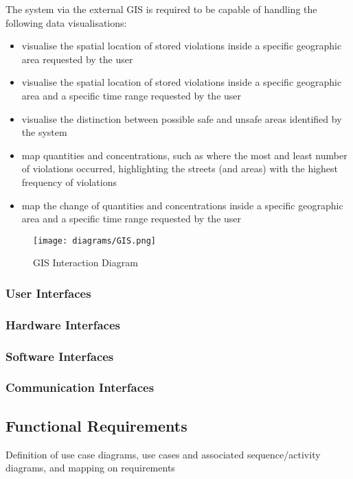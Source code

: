 	The system via the external GIS is required to be capable of handling the following data visualisations:
	
	\begin{itemize}
		\item visualise the spatial location of stored violations inside a specific geographic area requested by the user
		\item visualise the spatial location of stored violations inside a specific geographic area and a specific time range requested by the user
		\item visualise the distinction between possible safe and unsafe areas identified by the system
		\item map quantities and concentrations, such as where the most and least number of violations occurred, highlighting the streets (and areas) with the highest frequency of violations
		\item map the change of quantities and concentrations inside a specific geographic area and a specific time range requested by the user
	\end{itemize}

	\begin{figure}[h]
		\centering
		\texttt{[image: diagrams/GIS.png]}
		\caption{
			\label{fig:externalGIS} GIS Interaction Diagram}
	\end{figure}

\subsubsection{User Interfaces}
\label{sec:3userinterface}

\subsubsection{Hardware Interfaces}
\subsubsection{Software Interfaces}
\subsubsection{Communication Interfaces}


\subsection{Functional Requirements}
Definition of use case diagrams, use cases and associated sequence/activity diagrams, and mapping on requirements

